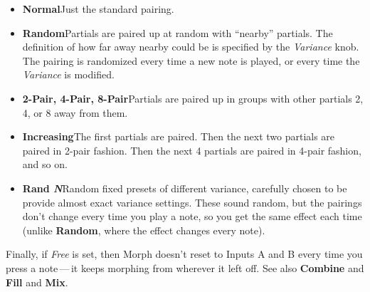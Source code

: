 \documentclass{article}
\begin{document}
\begin{itemize}
\item {\bf Normal}\qquad Just the standard pairing.
\item {\bf Random}\qquad Partials are paired up at random with ``nearby'' partials.  The definition of how far away nearby could be is specified by the {\it Variance} knob.  The pairing is randomized every time a new note is played, or every time the {\it Variance} is modified.
\item {\bf 2-Pair, 4-Pair, 8-Pair}\qquad Partials are paired up in groups with other partials 2, 4, or 8 away from them.
\item {\bf Increasing}\qquad The first partials are paired.  Then the next two partials are paired in 2-pair fashion.  Then the next 4 partials are paired in 4-pair fashion, and so on.
\item {\bf Rand \textit{N}}\qquad Random fixed presets of different variance, carefully chosen to be provide almost exact variance settings.  These sound random, but the pairings don't change every time you play a note, so you get the same effect each time (unlike {\bf Random}, where the effect changes every note).
\end{itemize}



Finally, if {\it Free} is set, then Morph doesn't reset to Inputs A and B every time you press a note\,---\,it keeps morphing from wherever it left off.  See also  {\bf Combine} and {\bf Fill} and {\bf Mix}.
\end{document}
